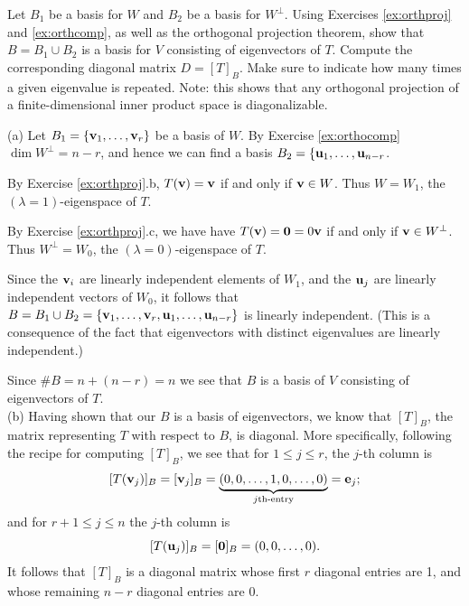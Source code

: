 \noindent
Let $B_1$ be a basis for $W$ and $B_2$ be a basis for $W^\perp$. 
\bb
\ii Using Exercises \ref{ex:orthproj} and \ref{ex:orthcomp}, as well as the orthogonal projection theorem, show that $B=B_1\cup B_2$ is a basis for $V$ consisting of eigenvectors of $T$.
\ii Compute the corresponding diagonal matrix $D=[T]_B$. Make sure to indicate how many times a given eigenvalue is repeated.
\ee 
Note: this shows that any orthogonal projection of a finite-dimensional inner product space is  diagonalizable. 
\\
\begin{solution}
\noindent
(a) Let $B_1=\{{\mathbf v}_1,\dots, {\mathbf v}_r\}$ be a basis of $W$. By Exercise \ref{ex:orthocomp} $\dim W^\perp=n-r$, and hence we can find a basis $B_2=\{{\mathbf u}_1,\dots, {\mathbf u}_{n-r}$. 

\noindent 
By Exercise \ref{ex:orthproj}.b, $T({\mathbf v})={\mathbf v}$ if and only if ${\mathbf v}\in W$. Thus $W=W_1$, the $(\lambda=1)$-eigenspace of $T$. 

\noindent By Exercise \ref{ex:orthproj}.c, we have have $T({\mathbf v})={\mathbf 0}=0{\mathbf v}$ if and only if ${\mathbf v}\in W^\perp$. Thus $W^\perp=W_0$, the $(\lambda=0)$-eigenspace of $T$. 

Since the ${\mathbf v}_i$ are linearly independent elements of $W_1$, and the ${\mathbf u}_j$ are linearly independent vectors of $W_0$, it follows that $B=B_1\cup B_2=\{{\mathbf v}_1,\dots, {\mathbf v}_r,{\mathbf u}_1,\dots, {\mathbf u}_{n-r}\}$ is linearly independent. (This is a consequence of the fact that eigenvectors with distinct eigenvalues are linearly independent.) 

\noindent
Since $\#B=n+(n-r)=n$ we see that $B$ is a basis of $V$ consisting of eigenvectors of $T$.    
\vspace{.1in}
\\
(b) 	Having shown that our $B$ is a basis of eigenvectors, we know that $[T]_B$, the matrix representing $T$ with respect to $B$, is diagonal. More specifically, following the recipe for computing $[T]_B$, we see that for $1\leq j\leq r$, the $j$-th column is 
\[
[T({\mathbf v}_j)]_B=[{\mathbf v}_j]_B=\underset{\text{$j$th-entry}}{\underbrace{(0,0,\dots, 1,0,\dots, 0)}}={\mathbf e}_j;
\]
and for $r+1\leq j\leq n$ the $j$-th column is 
\[
[T({\mathbf u}_j)]_B=[{\mathbf 0}]_B=(0,0,\dots, 0).
\]
It follows that $[T]_B$ is a diagonal matrix whose first $r$ diagonal entries are 1, and whose remaining $n-r$ diagonal entries are $0$. 
\end{solution}

